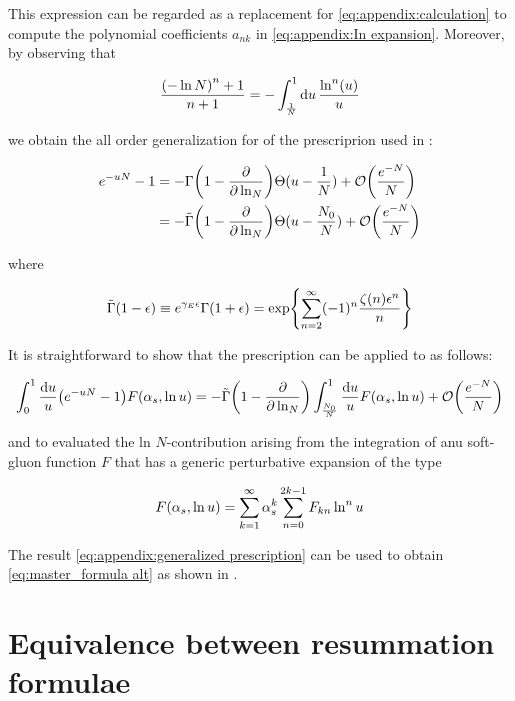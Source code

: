 \documentclass[../main.tex]{subfiles}
\begin{document}
This expression can be regarded as a replacement for \cref{eq:appendix:calculation} to compute the polynomial coefficients $a_{nk}$ 
in \cref{eq:appendix:In expansion}. Moreover, by observing that 

\begin{equation}
    \frac{ \qty(-\ln N)^n+1}{n+1} = -\int_{\frac{1}{N}}^1 \dd{u} \frac{\ln^n(u)}{u}
\end{equation}

we obtain the all order generalization for of the prescriprion used in \cite{CATANI19933}:

\begin{align}
    e^{-uN}-1 &= -\Gamma\qty(1-\pdv{\ln_N}) \Theta(u-\frac{1}{N}) + \order{\frac{e^{-N}}{N}}\\
              &=  -\tilde{\Gamma}\qty(1-\pdv{\ln_N}) \Theta(u-\frac{N_0}{N}) + \order{\frac{e^{-N}}{N}}
\end{align}

where 

\begin{equation}\label{eq:appendix:gamma tilde}
    \tilde{\Gamma}\qty(1-\epsilon) \equiv e^{\gamma_E \epsilon} \Gamma(1+\epsilon) = \exp{\sum_{n=2}^\infty (-1)^n \frac{ \zeta(n) \epsilon^n}{n}}
\end{equation}

It is straightforward to show that the prescription can be applied to as follows:

\begin{equation} \label{eq:appendix:generalized prescription}
    \int_0^1 \frac{\dd{u}}{u} \qty(e^{-u N} - 1) F\qty(\alpha_s , \ln u) = -\tilde{\Gamma}\qty(1-\pdv{\ln_N}) \int_{\frac{N_0}{N}}^1 \frac{\dd{u}}{u} F\qty(\alpha_s , \ln u) + \order{\frac{e^{-N}}{N}}
\end{equation}
    
and to evaluated the ln $N$-contribution arising from the integration of anu soft-gluon function $F$ that has a generic perturbative expansion of the type

\begin{equation}
    F\qty(\alpha_s , \ln u) = \sum_{k=1}^\infty \alpha_s^k \sum_{n=0}^{2k-1} F_{kn}\ln^n u
\end{equation}

The result \cref{eq:appendix:generalized prescription} can be used to obtain \cref{eq:master_formula alt} as shown in \cite{Catani_2003_appendix}.

\chapter{Equivalence between resummation formulae} \label{Appendix: Coefficients}
\end{document}
